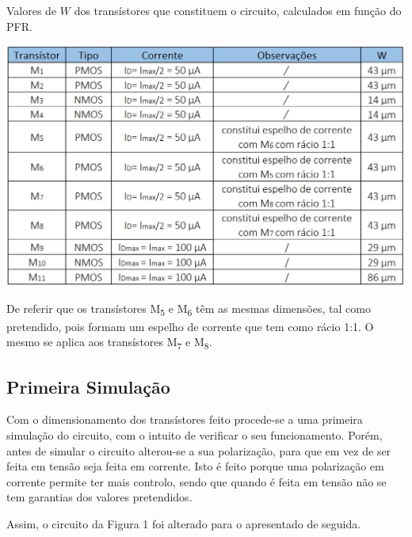 \documentclass[11pt]{article}
\numberwithin{equation}{section}
\begin{document}
\begin{table}[H]
	\centering
	\caption{Valores de $W$ dos transístores que constituem o circuito, calculados em função do PFR.}
	\vspace{-1.5mm}
	\includegraphics[keepaspectratio=true, scale=0.45]{teoricas/valoresW2}
\end{table}

De referir que os transístores M\textsubscript{5} e M\textsubscript{6} têm as mesmas dimensões, tal como pretendido, pois formam um espelho de corrente que tem como rácio 1:1. O mesmo se aplica aos transístores M\textsubscript{7} e M\textsubscript{8}.

\subsection{Primeira Simulação}

Com o dimensionamento dos transístores feito procede-se a uma primeira simulação do circuito, com o intuito de verificar o seu funcionamento. Porém, antes de simular o circuito alterou-se a sua polarização, para que em vez de ser feita em tensão seja feita em corrente. Isto é feito porque uma polarização em corrente permite ter mais controlo, sendo que quando é feita em tensão não se tem garantias dos valores pretendidos.  

Assim, o circuito da Figura 1 foi alterado para o apresentado de seguida.
\end{document}
